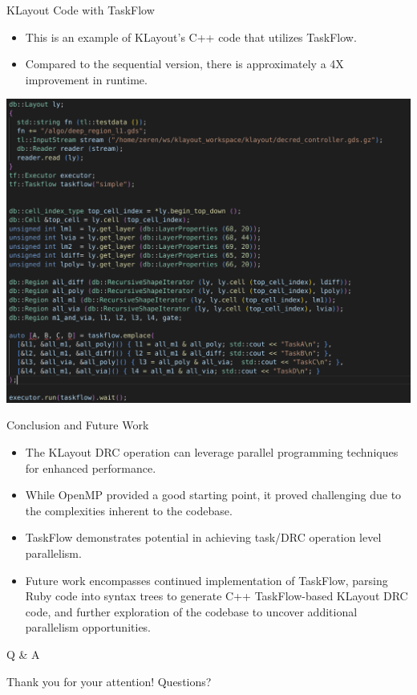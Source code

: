 \documentclass[aspectratio=169]{beamer} %
\begin{document}
\begin{frame}{KLayout Code with TaskFlow}
    \begin{itemize}
        \item This is an example of KLayout's C++ code that utilizes TaskFlow.
        \item Compared to the sequential version, there is approximately a 4X improvement in runtime.
    \end{itemize}
    \begin{center}
        \includegraphics[width=\textwidth,height=0.8\textheight,keepaspectratio]{klayout_taskflow.png}
    \end{center}
\end{frame}

\begin{frame}{Conclusion and Future Work}
    \begin{itemize}
        \item The KLayout DRC operation can leverage parallel programming techniques for enhanced performance.
        \item While OpenMP provided a good starting point, it proved challenging due to the complexities inherent to the codebase.
        \item TaskFlow demonstrates potential in achieving task/DRC operation level parallelism.
        \item Future work encompasses continued implementation of TaskFlow, parsing Ruby code into syntax trees to generate C++ TaskFlow-based KLayout DRC code, and further exploration of the codebase to uncover additional parallelism opportunities.
    \end{itemize}
\end{frame}


\begin{frame}{Q \& A}
    \begin{center}
        Thank you for your attention! Questions?
    \end{center}
\end{frame}
\end{document}
